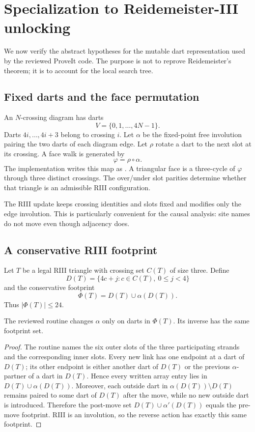 \section{Specialization to Reidemeister-III unlocking}
\label{sec:r3}

We now verify the abstract hypotheses for the mutable dart representation used
by the reviewed ProveIt code.  The purpose is not to reprove Reidemeister's
theorem; it is to account for the local search tree.

\subsection{Fixed darts and the face permutation}

An $N$-crossing diagram has darts
\[
  V=\{0,1,\ldots,4N-1\}.
\]
Darts $4i,\ldots,4i+3$ belong to crossing $i$.  Let $\alpha$ be the fixed-point
free involution pairing the two darts of each diagram edge.  Let $\rho$ rotate a
dart to the next slot at its crossing.  A face walk is generated by
\[
  \varphi=\rho\circ\alpha.
\]
The implementation writes this map as .  A triangular face is a
three-cycle of $\varphi$ through three distinct crossings.  The over/under slot
parities determine whether that triangle is an admissible RIII configuration.

The RIII update keeps crossing identities and slots fixed and modifies only the
edge involution.  This is particularly convenient for the causal analysis:
site names do not move even though adjacency does.

\subsection{A conservative RIII footprint}

Let $T$ be a legal RIII triangle with crossing set $C(T)$ of size three.  Define
\[
  D(T)=\{4c+j:c\in C(T),\ 0\leq j<4\}
\]
and the conservative footprint
\[
  \Phi(T)=D(T)\cup\alpha(D(T)).
\]
Thus $|\Phi(T)|\leq24$.

\begin{lemma}
\label{lem:r3-footprint}
The reviewed  routine changes $\alpha$ only on darts in
$\Phi(T)$.  Its inverse has the same footprint set.
\end{lemma}

\begin{proof}
The routine names the six outer slots of the three participating strands and
the corresponding inner slots.  Every new link has one endpoint at a dart of
$D(T)$; its other endpoint is either another dart of $D(T)$ or the previous
$\alpha$-partner of a dart in $D(T)$.  Hence every written array entry lies in
$D(T)\cup\alpha(D(T))$.  Moreover, each outside dart in
$\alpha(D(T))\setminus D(T)$ remains paired to some dart of $D(T)$ after the
move, while no new outside dart is introduced.  Therefore the post-move set
$D(T)\cup\alpha'(D(T))$ equals the pre-move footprint.  RIII is an involution,
so the reverse action has exactly this same footprint.
\end{proof}

